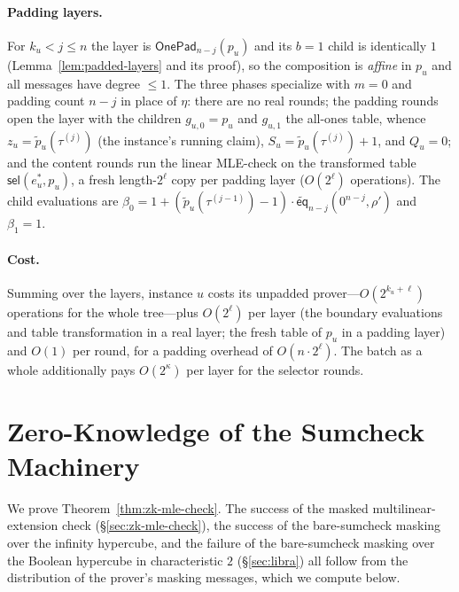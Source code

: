\documentclass{article}
\theoremstyle{definition}
\newcommand*{\mle}{\widetilde}
\newcommand{\eq}{\mathsf{eq}}
\newcommand{\sel}{\textsf{sel}}
\begin{document}
\paragraph{Padding layers.}
For $k_u < j \leq n$ the layer is $\textsf{OnePad}_{n - j}(p_u)$ and its $b = 1$ child is identically $1$ (Lemma~\ref{lem:padded-layers} and its proof), so the composition is \emph{affine} in $p_u$ and all messages have degree $\leq 1$. The three phases specialize with $m = 0$ and padding count $n - j$ in place of $\eta$: there are no real rounds; the padding rounds open the layer with the children $g_{u, 0} = p_u$ and $g_{u, 1}$ the all-ones table, whence $z_u = \mle{p}_u(\tau^{(j)})$ (the instance's running claim), $S_u = \mle{p}_u(\tau^{(j)}) + 1$, and $Q_u = 0$; and the content rounds run the linear MLE-check on the transformed table $\sel(e^*_u, p_u)$, a fresh length-$2^\ell$ copy per padding layer ($O(2^\ell)$ operations). The child evaluations are $\beta_0 = 1 + (\mle{p}_u(\tau^{(j - 1)}) - 1) \cdot \mle{\eq}_{n - j}(0^{n - j}, \rho')$ and $\beta_1 = 1$.

\paragraph{Cost.}
Summing over the layers, instance $u$ costs its unpadded prover---$O(2^{k_u + \ell})$ operations for the whole tree---plus $O(2^\ell)$ per layer (the boundary evaluations and table transformation in a real layer; the fresh table of $p_u$ in a padding layer) and $O(1)$ per round, for a padding overhead of $O(n \cdot 2^\ell)$. The batch as a whole additionally pays $O(2^\kappa)$ per layer for the selector rounds.

\section{Zero-Knowledge of the Sumcheck Machinery}
\label{app:zk-sumcheck}

We prove Theorem~\ref{thm:zk-mle-check}. The success of the masked multilinear-extension check (\S\ref{sec:zk-mle-check}), the success of the bare-sumcheck masking over the infinity hypercube, and the failure of the bare-sumcheck masking over the Boolean hypercube in characteristic $2$ (\S\ref{sec:libra}) all follow from the distribution of the prover's masking messages, which we compute below.
\end{document}
